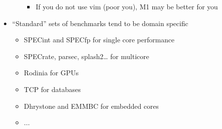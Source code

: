 \documentclass[12pt]{article}
\begin{document}
\begin{itemize}
\begin{itemize}
\begin{itemize}
                                \item {If you do not use vim (poor you), M1 may be better for you}
                            \end{itemize}
                    \end{itemize}
                \item {“Standard” sets of benchmarks tend to be domain specific}
                    \begin{itemize}
                        \item {SPECint and SPECfp for single core performance}
                        \item {SPECrate, parsec, splash2… for multicore}
                        \item {Rodinia for GPUs}
                        \item {TCP for databases}
                        \item {Dhrystone and EMMBC for embedded cores}
                        \item {...}
                    \end{itemize}
            \end{itemize}
\end{document}
